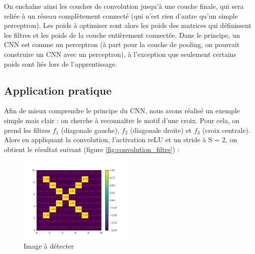 On enchaîne ainsi les couches de convolution jusqu'à une couche finale, qui sera reliée à un réseau complètement connecté (qui n'est rien d'autre qu'un simple perceptron).
Les poids à optimiser sont alors les poids des matrices qui définissent les filtres et les poids de la couche entièrement connectée.
Dans le principe, un CNN est comme un perceptron (à part pour la couche de pooling, on pourrait construire un CNN avec un perceptron), à l'exception que seulement certains poids sont liés lors de l'apprentissage.

\subsection{Application pratique}

Afin de mieux comprendre le principe du CNN, nous avons réalisé un exemple simple mais clair : on cherche à reconnaître le motif d'une croix.
Pour cela, on prend les filtres $f_1$ (diagonale gauche), $f_2$ (diagonale droite) et $f_3$ (croix centrale).
Alors en appliquant la convolution, l'activation reLU et un stride à S = 2, on obtient le résultat suivant (figure \ref{fig:convolution_filtre}) :

\begin{figure}[h]
    \center
    \includegraphics[width=0.5\textwidth]{img/cnn_exemple/cross/image_croix.png}
    \caption{Image à détecter}
\end{figure}

